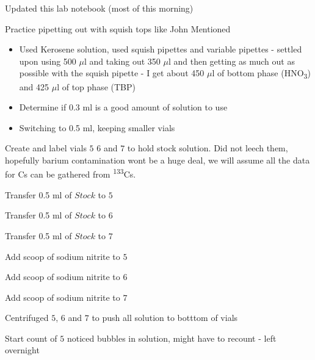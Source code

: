 \documentclass[idxtotoc,hyperref,openany,oneside]{labbook} %
\newcommand{\cmark}{\ding{51}}%
\newcommand{\done}{\rlap{$\square$}{\raisebox{2pt}{\large\hspace{1pt}\cmark}}%
  \hspace{-2.5pt}}
\newcommand{\tss}{\textsuperscript}
\newcommand{\tsbs}{\textsubscript}
\begin{document}


\begin{todolist}
\item[\done]{Updated this lab notebook (most of this morning)}
\end{todolist}


\begin{todolist}
\item[\done]{Practice pipetting out with squish tops like John Mentioned}
  \begin{itemize}
  \item{Used Kerosene solution, used squish pipettes and variable
    pipettes - settled upon using 500 $\mu$l
    and taking out 350 $\mu$l and then
    getting as much out as possible with the squish pipette -
    I get about 450 $\mu$l of bottom phase (HNO\tsbs{3})
    and 425 $\mu$l of top phase (TBP)}
  \item{Determine if 0.3 ml is a good amount of solution to use}
  \item{Switching to 0.5 ml, keeping smaller vials}
  \end{itemize}
\item[\done]{Create and label vials $\boxed{5}$ $\boxed{6}$ and
  $\boxed{7}$ to hold stock solution. Did not leech them,
  hopefully barium contamination wont be a huge deal,
  we will assume all the data for Cs can be gathered from \tss{133}Cs.}
\item[\done]{Transfer 0.5 ml of $\boxed{Stock}$ to $\boxed{5}$}
\item[\done]{Transfer 0.5 ml of $\boxed{Stock}$ to $\boxed{6}$}
\item[\done]{Transfer 0.5 ml of $\boxed{Stock}$ to $\boxed{7}$}
\item[\done]{Add scoop of sodium nitrite to $\boxed{5}$}
\item[\done]{Add scoop of sodium nitrite to $\boxed{6}$}
\item[\done]{Add scoop of sodium nitrite to $\boxed{7}$}
\item[\done]{Centrifuged $\boxed{5}$, $\boxed{6}$
  and $\boxed{7}$ to push all solution to
  botttom of vials}
\item[\done]{Start count of $\boxed{5}$ noticed bubbles in solution,
  might have to recount - left overnight}
\end{todolist}
\end{document}
